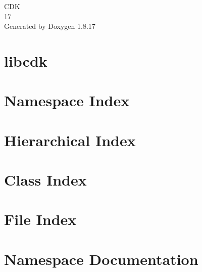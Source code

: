 \let\mypdfximage\pdfximage\def\pdfximage{\immediate\mypdfximage}\documentclass[twoside]{book}
\newcommand{\+}{\discretionary{\mbox{\scriptsize$\hookleftarrow$}}{}{}}
\newcommand{\clearemptydoublepage}{%
  \newpage{\pagestyle{empty}\cleardoublepage}%
}
\begin{document}
\hypersetup{pageanchor=false,
             bookmarksnumbered=true,
             pdfencoding=unicode
            }
\begin{titlepage}
\vspace*{7cm}
\begin{center}%
{\Large C\+DK \\[1ex]\large 17 }\\
\vspace*{1cm}
{\large Generated by Doxygen 1.8.17}\\
\end{center}
\end{titlepage}
\clearemptydoublepage
{}
\tableofcontents
\clearemptydoublepage
{}
\hypersetup{pageanchor=true}

\chapter{libcdk}
\label{md_README}

\chapter{Namespace Index}

\chapter{Hierarchical Index}

\chapter{Class Index}

\chapter{File Index}

\chapter{Namespace Documentation}

\end{document}
